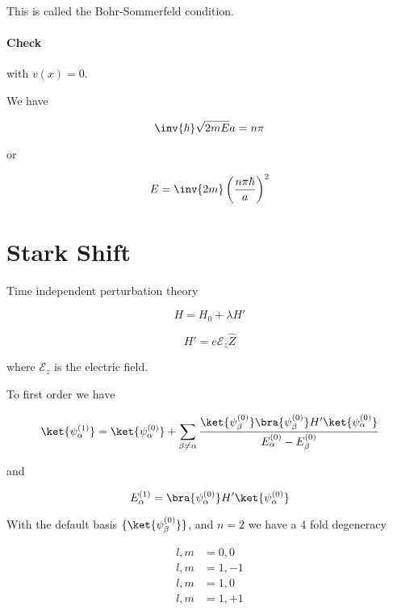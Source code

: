 This is called the Bohr-Sommerfeld condition.

\paragraph{Check} with $v(x) = 0$.

We have

\begin{equation}\label{eqn:qmTwoR3:210}
\inv{\hbar} \sqrt{2m E} a = n \pi
\end{equation}

or

\begin{equation}\label{eqn:qmTwoR3:230}
E = \inv{2m} \left(\frac{n \pi \hbar}{a}\right)^2
\end{equation}

\section{Stark Shift}

Time independent perturbation theory

\begin{equation}\label{eqn:qmTwoR3:250}
H = H_0 + \lambda H'
\end{equation}

\begin{equation}\label{eqn:qmTwoR3:270}
H' = e \mathcal{E}_z \hat{Z}
\end{equation}

where $\mathcal{E}_z$ is the electric field.

To first order we have

\begin{equation}\label{eqn:qmTwoR3:290}
\ket{\psi_\alpha^{(1)}} = \ket{\psi_\alpha^{(0)}} 
+ 
\sum_{\beta \ne \alpha} \frac{ 
\ket{\psi_\beta^{(0)}} \bra{\psi_\beta^{(0)}} H' \ket{\psi_\alpha^{(0)}} 
}{
E_\alpha^{(0)} 
-E_\beta^{(0)} 
}
\end{equation}

and 

\begin{equation}\label{eqn:qmTwoR3:310}
E_\alpha^{(1)} = 
\bra{\psi_\alpha^{(0)}} H' \ket{\psi_\alpha^{(0)}} 
\end{equation}

With the default basis $\{\ket{\psi_\beta^{(0)}}\}$, and $n=2$ we have a 4 fold degeneracy

\begin{align*}
l,m &= 0,0 \\
l,m &= 1,-1 \\
l,m &= 1,0 \\
l,m &= 1,+1
\end{align*}

